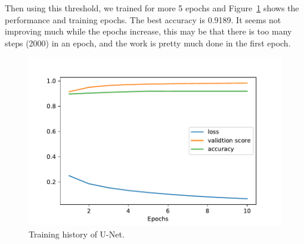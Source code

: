 Then using this threshold, we trained for more 5 epochs and Figure~\ref{fig:unethis} shows the performance and training epochs. The best accuracy is 0.9189. It seems not improving much while the epochs increase, this may be that there is too many steps (2000) in an epoch, and the work is pretty much done in the first epoch.
\begin{figure}[htpb]
    \centering
    \includegraphics[scale=0.5]{figuras/unethistory.pdf}
    \caption{Training history of U-Net.}\label{fig:unethis}
\end{figure}